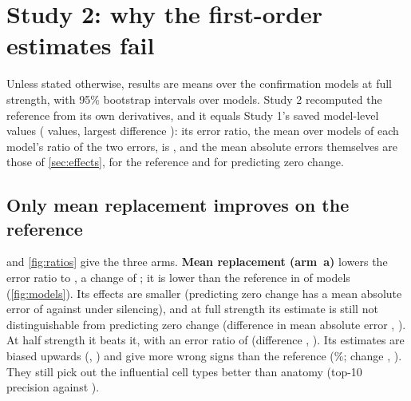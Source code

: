 \section{Study 2: why the first-order estimates fail}
\label{sec:study2}

Unless stated otherwise, results are means over the \NConfModels{} confirmation models at full strength, with 95\% bootstrap intervals over models. Study 2 recomputed the reference from its own derivatives, and it equals Study 1's saved model-level values (\RefCheckValues{} values, largest difference \RefCheckMax{}): its error ratio, the mean over models of each model's ratio of the two errors, is \RatioRefFull{} \RatioCIRefFull{}, and the mean absolute errors themselves are those of \cref{sec:effects}, \MaeFOFull{} for the reference and \MaeZeroFull{} for predicting zero change.

\subsection{Only mean replacement improves on the reference}
\label{sec:arms}

 and \cref{fig:ratios} give the three arms. \textbf{Mean replacement (arm~a)} lowers the error ratio to \RatioAFull{} \RatioCIAFull{}, a change of \ChangeAFull{} \ChangeCIAFull{}; it is lower than the reference in \LowerThanRefA{} of \NConfModels{} models (\cref{fig:models}). Its effects are smaller (predicting zero change has a mean absolute error of \MaeZeroAFull{} against \MaeZeroRefFull{} under silencing), and at full strength its estimate is still not distinguishable from predicting zero change (difference in mean absolute error \MaeDiffAFull{}, \MaeDiffCIAFull{}). At half strength it beats it, with an error ratio of \RatioAHalf{} \RatioCIAHalf{} (difference \MaeDiffAHalf{}, \MaeDiffCIAHalf{}). Its estimates are biased upwards (\BiasAFull{}, \BiasCIAFull{}) and give more wrong signs than the reference (\WrongAFull\%; change \WrongChangeAFull{}, \WrongChangeCIAFull{}). They still pick out the influential cell types better than anatomy (top-10 precision \TopTenAFull{} against \AnatAFull{}).

